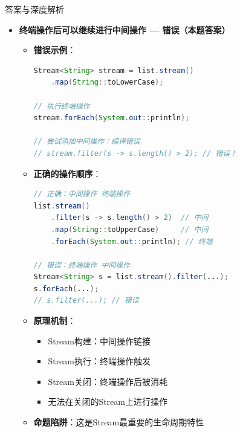 \documentclass[12pt, a4paper]{ctexart}
\begin{document}
\begin{enumerate}[label=\textbf{\arabic*.}]
\begin{bluebox}{答案与深度解析}
\begin{itemize}[leftmargin=*, nosep, label={}]
\begin{itemize}[label={}, leftmargin=*, nosep]
\begin{lstlisting}[language=Java]
// 方案2：将结果存储到变量
List<String> filtered = list.stream()
    .filter(s -> s.length() > 2)
    .collect(Collectors.toList());
// 可以多次使用结果
filtered.size();
filtered.forEach(...);
				      \end{lstlisting}
			            \end{itemize}

			      \item[D] \textbf{终端操作后可以继续进行中间操作 — 错误（本题答案）}
			            \begin{itemize}[label={}, leftmargin=*, nosep]
				            \item \textbf{错误示例}：
				                  \begin{lstlisting}[language=Java]
Stream<String> stream = list.stream()
    .map(String::toLowerCase);

// 执行终端操作
stream.forEach(System.out::println);

// 尝试添加中间操作：编译错误
// stream.filter(s -> s.length() > 2); // 错误！
                      \end{lstlisting}
				            \item \textbf{正确的操作顺序}：
				                  \begin{lstlisting}[language=Java]
// 正确：中间操作 终端操作
list.stream()
    .filter(s -> s.length() > 2)  // 中间
    .map(String::toUpperCase)     // 中间
    .forEach(System.out::println); // 终端

// 错误：终端操作 中间操作
Stream<String> s = list.stream().filter(...);
s.forEach(...);
// s.filter(...); // 错误
				      \end{lstlisting}
				            \item \textbf{原理机制}：
				                  \begin{itemize}[label={}, nosep]
					                  \item Stream构建：中间操作链接
					                  \item Stream执行：终端操作触发
					                  \item Stream关闭：终端操作后被消耗
					                  \item 无法在关闭的Stream上进行操作
				                  \end{itemize}
				            \item \textbf{命题陷阱}：这是Stream最重要的生命周期特性
			            \end{itemize}
		      \end{itemize}


\end{bluebox}
\end{enumerate}
\end{document}
